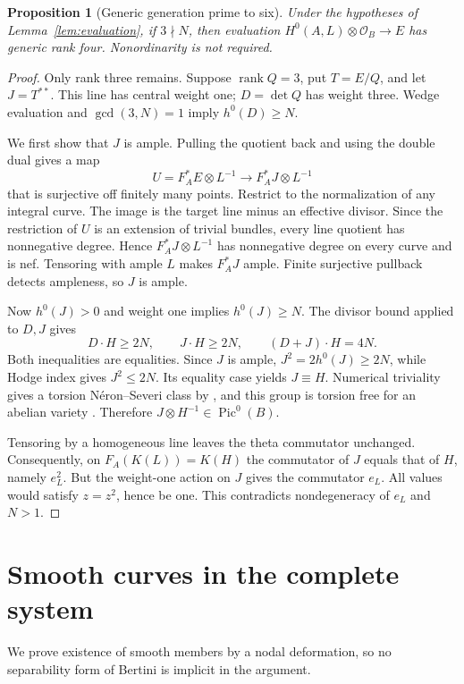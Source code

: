 \documentclass[11pt]{article}
\newtheorem{proposition}[theorem]{Proposition}
\theoremstyle{definition}\newtheorem{definition}[theorem]{Definition}
\theoremstyle{remark}\newtheorem{remark}[theorem]{Remark}
\newcommand{\OO}{\mathcal O}
\newcommand{\Pic}{\operatorname{Pic}}
\newcommand{\rk}{\operatorname{rank}}
\begin{document}
\begin{proposition}[Generic generation prime to six]\label{prop:rank-four}
Under the hypotheses of Lemma~\ref{lem:evaluation}, if $3\nmid N$, then evaluation $H^0(A,L)\otimes\OO_B\to E$ has generic rank four. Nonordinarity is not required.
\end{proposition}
\begin{proof}
Only rank three remains. Suppose $\rk Q=3$, put $T=E/Q$, and let $J=T^{**}$. This line has central weight one; $D=\det Q$ has weight three. Wedge evaluation and $\gcd(3,N)=1$ imply $h^0(D)\ge N$.

We first show that $J$ is ample. Pulling the quotient back and using the double dual gives a map
\[
 U=F_A^*E\otimes L^{-1}\longrightarrow F_A^*J\otimes L^{-1}
\]
that is surjective off finitely many points. Restrict to the normalization of any integral curve. The image is the target line minus an effective divisor. Since the restriction of $U$ is an extension of trivial bundles, every line quotient has nonnegative degree. Hence $F_A^*J\otimes L^{-1}$ has nonnegative degree on every curve and is nef. Tensoring with ample $L$ makes $F_A^*J$ ample. Finite surjective pullback detects ampleness, so $J$ is ample.

Now $h^0(J)>0$ and weight one implies $h^0(J)\ge N$. The divisor bound applied to $D,J$ gives
\[
 D\cdot H\ge2N,\qquad J\cdot H\ge2N,\qquad
 (D+J)\cdot H=4N.
\]
Both inequalities are equalities. Since $J$ is ample, $J^2=2h^0(J)\ge2N$, while Hodge index gives $J^2\le2N$. Its equality case yields $J\equiv H$. Numerical triviality gives a torsion N\'eron--Severi class by \citet[Theorem~6.3, pp.~52--54]{Kleiman}, and this group is torsion free for an abelian variety \citep[Corollaries~7.23 and 7.25, pp.~106--107]{EGM}. Therefore $J\otimes H^{-1}\in\Pic^0(B)$.

Tensoring by a homogeneous line leaves the theta commutator unchanged. Consequently, on $F_A(K(L))=K(H)$ the commutator of $J$ equals that of $H$, namely $e_L^2$. But the weight-one action on $J$ gives the commutator $e_L$. All values would satisfy $z=z^2$, hence be one. This contradicts nondegeneracy of $e_L$ and $N>1$.
\end{proof}

\section{Smooth curves in the complete system}\label{sec:smooth}

We prove existence of smooth members by a nodal deformation, so no separability form of Bertini is implicit in the argument.
\end{document}
